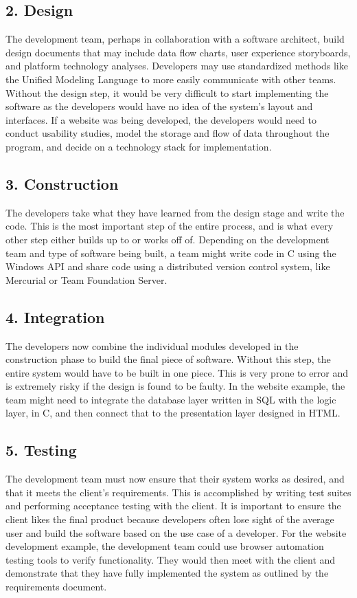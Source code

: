 \documentclass[12pt,letterpaper]{article}
\begin{document}
\subsection*{2. Design}
The development team, perhaps in collaboration with a software architect, build
design documents that may include data flow charts, user experience storyboards,
and platform technology analyses.  Developers may use standardized methods like
the Unified Modeling Language to more easily communicate with other teams.
Without the design step, it would be very difficult to start implementing the
software as the developers would have no idea of the system's layout and
interfaces.  If a website was being developed, the developers would need to
conduct usability studies, model the storage and flow of data throughout the
program, and decide on a technology stack for implementation.

\subsection*{3. Construction}
The developers take what they have learned from the design stage and write the
code.  This is the most important step of the entire process, and is what every
other step either builds up to or works off of.  Depending on the development
team and type of software being built, a team might write code in C using the
Windows API and share code using a distributed version control system, like
Mercurial or Team Foundation Server.

\subsection*{4. Integration}
The developers now combine the individual modules developed in the construction
phase to build the final piece of software.  Without this step, the entire
system would have to be built in one piece.  This is very prone to error and is
extremely risky if the design is found to be faulty.  In the website example,
the team might need to integrate the database layer written in SQL with the
logic layer, in C, and then connect that to the presentation layer designed in
HTML.

\subsection*{5. Testing}
The development team must now ensure that their system works as desired, and
that it meets the client's requirements.  This is accomplished by writing test
suites and performing acceptance testing with the client.  It is important to
ensure the client likes the final product because developers often lose sight of
the average user and build the software based on the use case of a developer.
For the website development example, the development team could use browser
automation testing tools to verify functionality.  They would then meet with the
client and demonstrate that they have fully implemented the system as outlined
by the requirements document.
\end{document}
